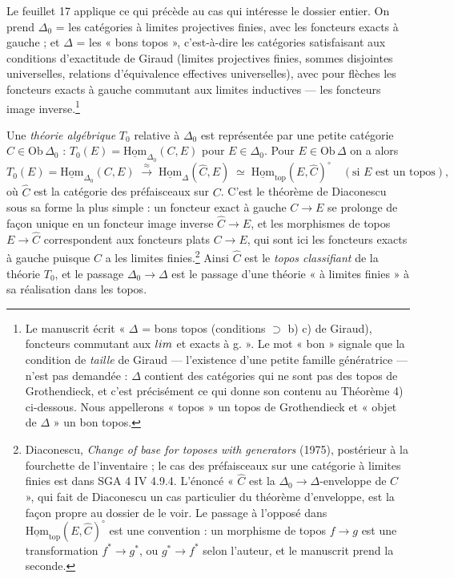 \documentclass[11pt,a4paper]{article}
\begin{document}
Le feuillet 17 applique ce qui précède au cas qui intéresse le dossier
entier. On prend $\Delta_{0}$ = les catégories à limites projectives
finies, avec les foncteurs exacts à gauche ; et $\Delta$ = les « bons
topos », c'est-à-dire les catégories satisfaisant aux conditions
d'exactitude de Giraud (limites projectives finies, sommes disjointes
universelles, relations d'équivalence effectives universelles), avec pour
flèches les foncteurs exacts à gauche commutant aux limites inductives —
les foncteurs image inverse.\footnote{Le manuscrit écrit « $\Delta$ = bons
topos (conditions $\supset$ b) c) de Giraud), foncteurs commutant aux
$\varprojlim$ et exacts à g. ». Le mot « bon » signale que la condition de
\emph{taille} de Giraud — l'existence d'une petite famille génératrice —
n'est pas demandée : $\Delta$ contient des catégories qui ne sont pas des
topos de Grothendieck, et c'est précisément ce qui donne son contenu au
Théorème 4) ci-dessous. Nous appellerons « topos » un topos de Grothendieck
et « objet de $\Delta$ » un bon topos.}

Une \emph{théorie algébrique} $T_{0}$ relative à $\Delta_{0}$ est
représentée par une petite catégorie $C \in \mathrm{Ob}\,\Delta_{0}$ :
$T_{0}(E) = \underline{\mathrm{Hom}}_{\Delta_{0}}(C, E)$ pour $E \in
\Delta_{0}$. Pour $E \in \mathrm{Ob}\,\Delta$ on a alors
\[
T_{0}(E) = \underline{\mathrm{Hom}}_{\Delta_{0}}(C, E)
\;\xrightarrow{\ \approx\ }\;
\underline{\mathrm{Hom}}_{\Delta}(\widehat{C}, E)
\;\simeq\; \underline{\mathrm{Hom}}_{\mathrm{top}}(E, \widehat{C})^{\circ}
\quad (\text{si $E$ est un topos}),
\]
où $\widehat{C}$ est la catégorie des préfaisceaux sur $C$. C'est le
théorème de Diaconescu sous sa forme la plus simple : un foncteur exact à
gauche $C \to E$ se prolonge de façon unique en un foncteur image inverse
$\widehat{C} \to E$, et les morphismes de topos $E \to \widehat{C}$
correspondent aux foncteurs plats $C \to E$, qui sont ici les foncteurs
exacts à gauche puisque $C$ a les limites finies.\footnote{Diaconescu,
\emph{Change of base for toposes with generators} (1975), postérieur à la
fourchette de l'inventaire ; le cas des préfaisceaux sur une catégorie à
limites finies est dans SGA 4 IV 4.9.4. L'énoncé « $\widehat{C}$ est la
$\Delta_{0} \to \Delta$-enveloppe de $C$ », qui fait de Diaconescu un cas
particulier du théorème d'enveloppe, est la façon propre au dossier de le
voir. Le passage à l'opposé dans $\underline{\mathrm{Hom}}_{\mathrm{top}}
(E, \widehat{C})^{\circ}$ est une convention : un morphisme de topos $f \to
g$ est une transformation $f^{*} \to g^{*}$, ou $g^{*} \to f^{*}$ selon
l'auteur, et le manuscrit prend la seconde.} Ainsi $\widehat{C}$ est le
\emph{topos classifiant} de la théorie $T_{0}$, et le passage $\Delta_{0}
\to \Delta$ est le passage d'une théorie « à limites finies » à sa
réalisation dans les topos.
\end{document}
